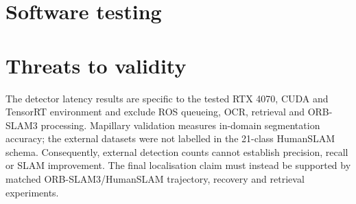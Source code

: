 \section{Software testing}

\section{Threats to validity}

The detector latency results are specific to the tested RTX 4070, CUDA and
TensorRT environment and exclude ROS queueing, OCR, retrieval and ORB-SLAM3
processing. Mapillary validation measures in-domain segmentation accuracy;
the external datasets were not labelled in the 21-class HumanSLAM schema.
Consequently, external detection counts cannot establish precision, recall or
SLAM improvement. The final localisation claim must instead be supported by
matched ORB-SLAM3/HumanSLAM trajectory, recovery and retrieval experiments.
